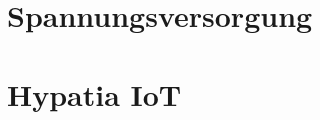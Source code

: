 \documentclass[10pt,a4paper,bibliography=totoc]{scrbook}
\begin{document}
  



%  

%  
  
%  
%  
%  
%
%
%
%
%
%
%
%
%
%
%
%



\part{Spannungsversorgung}





\part{Hypatia IoT}

\end{document}
